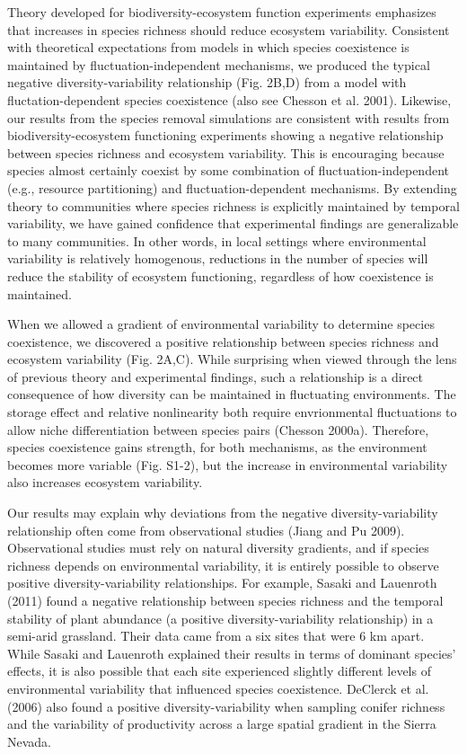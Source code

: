 \documentclass[12pt,]{article}
\begin{document}
Theory developed for biodiversity-ecosystem function experiments
emphasizes that increases in species richness should reduce ecosystem
variability. Consistent with theoretical expectations from models in
which species coexistence is maintained by fluctuation-independent
mechanisms, we produced the typical negative diversity-variability
relationship (Fig. 2B,D) from a model with fluctation-dependent species
coexistence (also see Chesson et al. 2001). Likewise, our results from
the species removal simulations are consistent with results from
biodiversity-ecosystem functioning experiments showing a negative
relationship between species richness and ecosystem variability. This is
encouraging because species almost certainly coexist by some combination
of fluctuation-independent (e.g., resource partitioning) and
fluctuation-dependent mechanisms. By extending theory to communities
where species richness is explicitly maintained by temporal variability,
we have gained confidence that experimental findings are generalizable
to many communities. In other words, in local settings where
environmental variability is relatively homogenous, reductions in the
number of species will reduce the stability of ecosystem functioning,
regardless of how coexistence is maintained.

When we allowed a gradient of environmental variability to determine
species coexistence, we discovered a positive relationship between
species richness and ecosystem variability (Fig. 2A,C). While surprising
when viewed through the lens of previous theory and experimental
findings, such a relationship is a direct consequence of how diversity
can be maintained in fluctuating environments. The storage effect and
relative nonlinearity both require envrionmental fluctuations to allow
niche differentiation between species pairs (Chesson 2000a). Therefore,
species coexistence gains strength, for both mechanisms, as the
environment becomes more variable (Fig. S1-2), but the increase in
environmental variability also increases ecosystem variability.

Our results may explain why deviations from the negative
diversity-variability relationship often come from observational studies
(Jiang and Pu 2009). Observational studies must rely on natural
diversity gradients, and if species richness depends on environmental
variability, it is entirely possible to observe positive
diversity-variability relationships. For example, Sasaki and Lauenroth
(2011) found a negative relationship between species richness and the
temporal stability of plant abundance (a positive diversity-variability
relationship) in a semi-arid grassland. Their data came from a six sites
that were 6 km apart. While Sasaki and Lauenroth explained their results
in terms of dominant species' effects, it is also possible that each
site experienced slightly different levels of environmental variability
that influenced species coexistence. DeClerck et al. (2006) also found a
positive diversity-variability when sampling conifer richness and the
variability of productivity across a large spatial gradient in the
Sierra Nevada.
\end{document}
